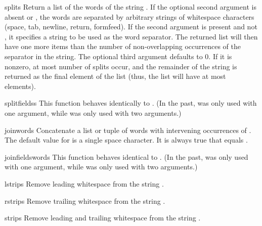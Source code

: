 \begin{funcdesc}{split}{s}
Return a list of the words of the string .  If the optional
second argument  is absent or , the words are
separated by arbitrary strings of whitespace characters (space, tab,
newline, return, formfeed).  If the second argument  is
present and not , it specifies a string to be used as the
word separator.  The returned list will then have one more items than
the number of non-overlapping occurrences of the separator in the
string.  The optional third argument  defaults to 0.  If
it is nonzero, at most  number of splits occur, and the
remainder of the string is returned as the final element of the list
(thus, the list will have at most  elements).
\end{funcdesc}

\begin{funcdesc}{splitfields}{s}
This function behaves identically to .  (In the
past,  was only used with one argument, while
 was only used with two arguments.)
\end{funcdesc}

\begin{funcdesc}{join}{words}
Concatenate a list or tuple of words with intervening occurrences of
.  The default value for  is a single space
character.  It is always true that
equals .
\end{funcdesc}

\begin{funcdesc}{joinfields}{words}
This function behaves identical to .  (In the past,
 was only used with one argument, while
 was only used with two arguments.)
\end{funcdesc}

\begin{funcdesc}{lstrip}{s}
Remove leading whitespace from the string .
\end{funcdesc}

\begin{funcdesc}{rstrip}{s}
Remove trailing whitespace from the string .
\end{funcdesc}

\begin{funcdesc}{strip}{s}
Remove leading and trailing whitespace from the string .
\end{funcdesc}

